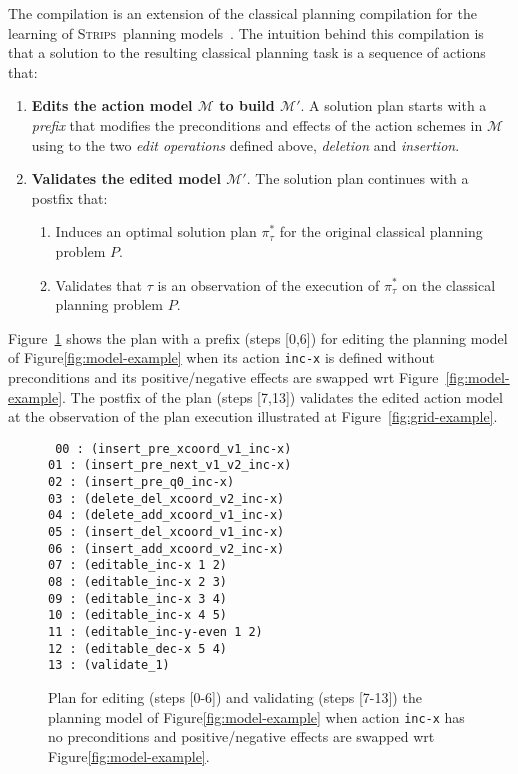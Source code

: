 \documentclass[letterpaper]{article} %
\newcommand{\strips}{\textsc{Strips}}     %
\begin{document}
The compilation is an extension of the classical planning compilation for the learning of \strips\ planning models~\cite{aineto2018learning}. The intuition behind this compilation is that a solution to the resulting classical planning task is a sequence of actions that:
\begin{enumerate}
\item {\bf Edits the action model $\mathcal{M}$ to build $\mathcal{M}'$}. A solution plan starts with a {\em prefix} that modifies the preconditions and effects of the action schemes in $\mathcal{M}$ using to the two {\em edit operations} defined above, {\em deletion} and {\em insertion}. 
\item {\bf Validates the edited model $\mathcal{M}'$}. The solution plan continues with a postfix that:
\begin{enumerate}
\item Induces an optimal solution plan $\pi^*_\tau$ for the original classical planning problem $P$.
\item Validates that $\tau$ is an observation of the execution of $\pi^*_\tau$ on the classical planning problem $P$.
\end{enumerate}
\end{enumerate}

Figure~\ref{fig:plan-pdistance} shows the plan with a prefix (steps [0,6]) for editing the planning model of Figure\ref{fig:model-example} when its action {\tt\small inc-x} is defined without preconditions and its positive/negative effects are swapped wrt Figure~\ref{fig:model-example}. The postfix of the plan (steps [7,13]) validates the edited action model at the observation of the plan execution illustrated at Figure~\ref{fig:grid-example}. 
\begin{figure}
{\tt\footnotesize
00 : (insert\_pre\_xcoord\_v1\_inc-x)\\
01 : (insert\_pre\_next\_v1\_v2\_inc-x)\\
02 : (insert\_pre\_q0\_inc-x)\\
03 : (delete\_del\_xcoord\_v2\_inc-x)\\
04 : (delete\_add\_xcoord\_v1\_inc-x)\\
05 : (insert\_del\_xcoord\_v1\_inc-x)\\
06 : (insert\_add\_xcoord\_v2\_inc-x)\\
07 : (editable\_inc-x 1 2)\\
08 : (editable\_inc-x 2 3)\\
09 : (editable\_inc-x 3 4)\\
10 : (editable\_inc-x 4 5)\\
11 : (editable\_inc-y-even 1 2)\\
12 : (editable\_dec-x 5 4)\\
13 : (validate\_1)
}
 \caption{\small Plan for editing (steps [0-6]) and validating (steps [7-13]) the planning model of Figure\ref{fig:model-example} when action {\tt\small inc-x} has no preconditions and positive/negative effects are swapped wrt Figure\ref{fig:model-example}.}
\label{fig:plan-pdistance}
\end{figure}
\end{document}

